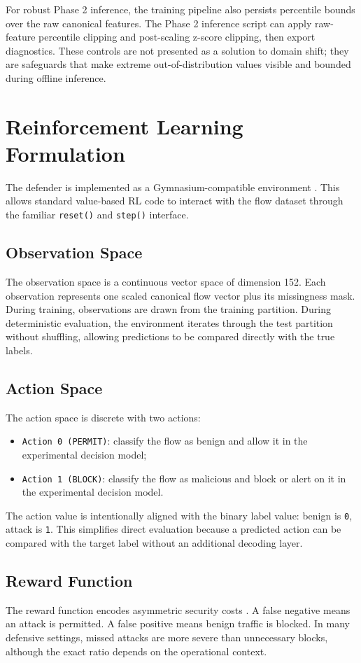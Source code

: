 For robust Phase 2 inference, the training pipeline also persists percentile bounds over the raw canonical features. The Phase 2 inference script can apply raw-feature percentile clipping and post-scaling z-score clipping, then export diagnostics. These controls are not presented as a solution to domain shift; they are safeguards that make extreme out-of-distribution values visible and bounded during offline inference.

\section{Reinforcement Learning Formulation}
The defender is implemented as a Gymnasium-compatible environment \parencite{GymnasiumDocs}. This allows standard value-based RL code to interact with the flow dataset through the familiar \texttt{reset()} and \texttt{step()} interface.

\subsection{Observation Space}
The observation space is a continuous vector space of dimension 152. Each observation represents one scaled canonical flow vector plus its missingness mask. During training, observations are drawn from the training partition. During deterministic evaluation, the environment iterates through the test partition without shuffling, allowing predictions to be compared directly with the true labels.

\subsection{Action Space}
The action space is discrete with two actions:
\begin{itemize}
    \item \texttt{Action 0 (PERMIT)}: classify the flow as benign and allow it in the experimental decision model;
    \item \texttt{Action 1 (BLOCK)}: classify the flow as malicious and block or alert on it in the experimental decision model.
\end{itemize}

The action value is intentionally aligned with the binary label value: benign is \texttt{0}, attack is \texttt{1}. This simplifies direct evaluation because a predicted action can be compared with the target label without an additional decoding layer.

\subsection{Reward Function}
The reward function encodes asymmetric security costs \parencite{Lee2002CostSensitiveIDS,Cardenas2006IDSFramework}. A false negative means an attack is permitted. A false positive means benign traffic is blocked. In many defensive settings, missed attacks are more severe than unnecessary blocks, although the exact ratio depends on the operational context.

